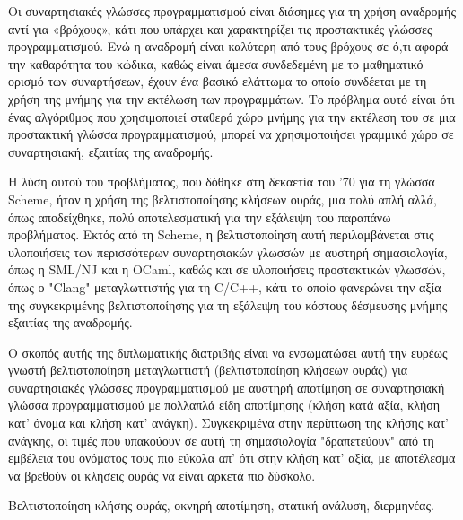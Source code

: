 \documentclass[diploma]{softlab-thesis}
\begin{document}
\begin{abstractgr}%

Οι συναρτησιακές γλώσσες προγραμματισμού είναι διάσημες για τη χρήση αναδρομής αντί για «βρόχους», 
κάτι που υπάρχει και χαρακτηρίζει τις προστακτικές γλώσσες προγραμματισμού. Ενώ η αναδρομή είναι καλύτερη από 
τους βρόχους σε ό,τι αφορά την καθαρότητα του κώδικα, καθώς είναι άμεσα συνδεδεμένη με το μαθηματικό ορισμό
των συναρτήσεων, έχουν ένα βασικό ελάττωμα το οποίο συνδέεται με τη χρήση της μνήμης για την εκτέλωση των 
προγραμμάτων. Το πρόβλημα αυτό είναι ότι ένας αλγόριθμος που χρησιμοποιεί σταθερό χώρο μνήμης για την εκτέλεση του
σε μια προστακτική γλώσσα προγραμματισμού, μπορεί να χρησιμοποιήσει γραμμικό χώρο σε συναρτησιακή, εξαιτίας 
της αναδρομής.
  

Η λύση αυτού του προβλήματος, που δόθηκε στη δεκαετία του '70 για τη γλώσσα Scheme, ήταν η χρήση της βελτιστοποίησης
κλήσεων ουράς, μια πολύ απλή αλλά, όπως αποδείχθηκε, πολύ αποτελεσματική για την εξάλειψη του παραπάνω προβλήματος.
Εκτός από τη Scheme, η βελτιστοποίηση αυτή περιλαμβάνεται στις υλοποιήσεις των περισσότερων συναρτησιακών 
γλωσσών με αυστηρή σημασιολογία, όπως η SML/NJ και η OCaml, καθώς και σε υλοποιήσεις προστακτικών 
γλωσσών, όπως ο "Clang" μεταγλωττιστής για τη C/C++, κάτι το οποίο φανερώνει την αξία της συγκεκριμένης 
βελτιστοποίησης για τη εξάλειψη του κόστους δέσμευσης μνήμης εξαιτίας της αναδρομής. 

Ο σκοπός αυτής της διπλωματικής διατριβής είναι να ενσωματώσει αυτή την ευρέως γνωστή βελτιστοποίηση 
μεταγλωττιστή (βελτιστοποίηση κλήσεων ουράς) για συναρτησιακές γλώσσες προγραμματισμού με αυστηρή αποτίμηση σε 
συναρτησιακή γλώσσα προγραμματισμού με πολλαπλά είδη αποτίμησης (κλήση κατά αξία, κλήση κατ' όνομα και 
κλήση κατ' ανάγκη). Συγκεκριμένα στην  περίπτωση της κλήσης κατ' ανάγκης, οι τιμές που υπακούουν σε αυτή τη
σημασιολογία "δραπετεύουν" από τη εμβέλεια του ονόματος τους πιο εύκολα απ' ότι στην 
κλήση κατ' αξία, με αποτέλεσμα να βρεθούν οι κλήσεις ουράς να είναι αρκετά πιο δύσκολο.


\begin{keywordsgr}
Βελτιστοποίηση κλήσης ουράς, οκνηρή αποτίμηση, στατική ανάλυση, διερμηνέας.
\end{keywordsgr}
\end{abstractgr}



\end{document}
